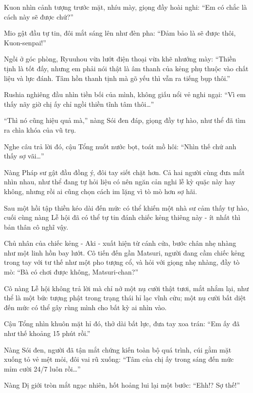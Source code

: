 \documentclass[../main.tex]{subfiles}
\begin{document}
Kuon nhìn cảnh tượng trước mặt, nhíu mày, giọng đầy hoài nghi: ``Em có chắc là cách này sẽ được chứ?''

Mio gật đầu tự tin, đôi mắt sáng lên như đèn pha: ``Đảm bảo là sẽ được thôi, Kuon-senpai!''

Ngồi ở góc phòng, Ryuuhou vừa lướt điện thoại vừa khẽ nhướng mày: ``Thiền tịnh là tốt đấy, nhưng em phải nói thật là âm thanh của kẻng phụ thuộc vào chất liệu và lực đánh. Tâm hồn thanh tịnh mà gõ yếu thì vẫn ra tiếng bụp thôi.''

Rushia nghiêng đầu nhìn tiền bối của mình, không giấu nổi vẻ nghi ngại: ``Vì em thấy nãy giờ chị ấy chỉ ngồi thiền tĩnh tâm thôi\dots''

``Thì nó cũng hiệu quả mà,'' nàng Sói đen đáp, giọng đầy tự hào, như thể đã tìm ra chìa khóa của vũ trụ.

Nghe câu trả lời đó, cậu Tổng nuốt nước bọt, toát mồ hôi: ``Nhìn thế chứ anh thấy sợ vãi\dots''

Nàng Pháp sư gật đầu đồng ý, đôi tay siết chặt hơn. Cả hai người cùng đưa mắt nhìn nhau, như thể đang tự hỏi liệu có nên ngăn cản nghi lễ kỳ quặc này hay không, nhưng rồi ai cũng chọn cách im lặng vì tò mò hơn sợ hãi.

\ct

Sau một hồi tập thiền kéo dài đến mức có thể khiến một nhà sư cảm thấy tự hào, cuối cùng nàng Lễ hội đã có thể tự tin đánh chiếc kẻng thiêng này - ít nhất thì bản thân cô nghĩ vậy.

Chủ nhân của chiếc kẻng - Aki - xuất hiện từ cánh cửa, bước chân nhẹ nhàng như một linh hồn bay lướt. Cô tiến đến gần Matsuri, người đang cầm chiếc kẻng trong tay với tư thế như một pho tượng cổ, và hỏi với giọng nhẹ nhàng, đầy tò mò: ``Bà có chơi được không, Matsuri-chan?''

Cô nàng Lễ hội không trả lời mà chỉ nở một nụ cười thật tươi, mắt nhắm lại, như thể là một bức tượng phật trong trạng thái hỉ lạc vĩnh cửu; một nụ cười bất diệt đến mức có thể gây rùng mình cho bất kỳ ai nhìn vào.

Cậu Tổng nhìn khuôn mặt hỉ đó, thở dài bất lực, đưa tay xoa trán: ``Em ấy đã như thế khoảng 15 phút rồi.''

Nàng Sói đen, người đã tận mắt chứng kiến toàn bộ quá trình, cúi gằm mặt xuống tỏ vẻ mệt mỏi, đôi vai rũ xuống: ``Tâm của chị ấy trong sáng đến mức mỉm cười 24/7 luôn rồi\dots''


Nàng Dị giới tròn mắt ngạc nhiên, hốt hoảng lui lại một bước: ``Ehh!? Sợ thế!''
\end{document}
